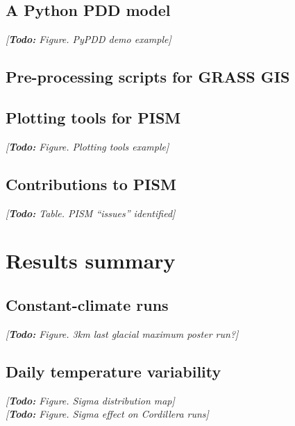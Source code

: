 \documentclass{article}
\newcommand{\todo}[1]{\emph{[\textbf{Todo:} #1]}}
\begin{document}
\subsection{A Python PDD model}
\todo{Figure. PyPDD demo example}

\subsection{Pre-processing scripts for GRASS GIS}

\subsection{Plotting tools for PISM}
\todo{Figure. Plotting tools example}

\subsection{Contributions to PISM}
\todo{Table. PISM ``issues'' identified}

\section{Results summary}

\subsection{Constant-climate runs}
\todo{Figure. 3km last glacial maximum poster run?}

\subsection{Daily temperature variability}
\todo{Figure. Sigma distribution map}\\
\todo{Figure. Sigma effect on Cordillera runs}
\end{document}
